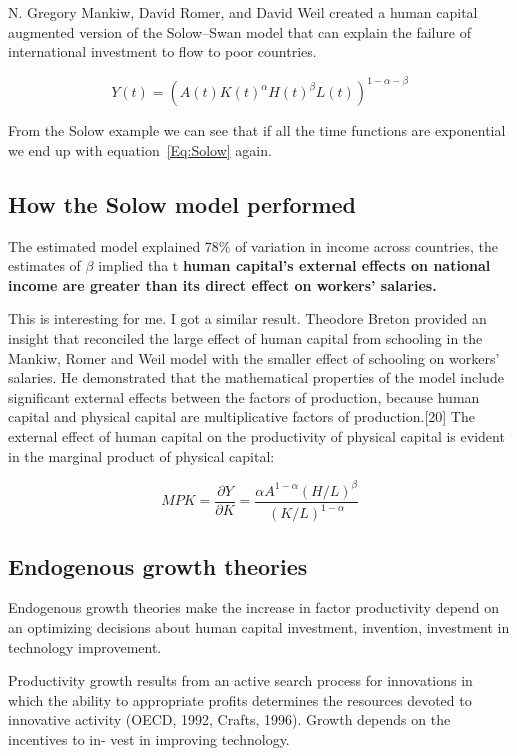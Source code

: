  N. Gregory Mankiw, David Romer, and David Weil created a human capital augmented version of the Solow–Swan model that can explain the failure of international investment to flow to poor countries.

    \[Y(t)=(A(t)K(t)^\alpha H(t)^\beta L(t))^{1-\alpha -\beta} \]
    
    From the Solow example we can see that if all the time functions are exponential we end up with equation~\ref{Eq:Solow} again.
    
\subsection{How the Solow model performed}    
The estimated model explained 78\% of variation in income across countries, the estimates of $\beta$ implied tha t\textbf{ human capital's external effects on national income are greater than its direct effect on workers' salaries.}%
    
This is interesting for me. I got a similar result. Theodore Breton provided an insight that reconciled the large effect of human capital from schooling in the Mankiw, Romer and Weil model with the smaller effect of schooling on workers' salaries. He demonstrated that the mathematical properties of the model include significant external effects between the factors of production, because human capital and physical capital are multiplicative factors of production.[20] The external effect of human capital on the productivity of physical capital is evident in the marginal product of physical capital:

    \[ MPK={\frac {\partial Y}{\partial K}}=\frac {\alpha A^{1-\alpha }(H/L)^{\beta }}{(K/L)^{1-\alpha} }\]
 
 \subsection{Endogenous growth theories}  
 Endogenous growth theories make the increase in factor productivity depend on an optimizing decisions about human capital investment, invention, investment in technology improvement.  
 
  Productivity growth results from an active search process for innovations in
which the ability to appropriate profits determines the resources devoted to
innovative activity (OECD, 1992, Crafts, 1996). Growth depends on the incentives to in-
vest in improving technology.%
 
